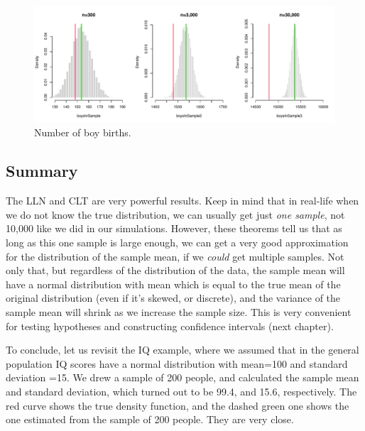 \begin{knitrout}
\begin{figure}
{\centering \includegraphics[width=\maxwidth]{figure/intro-lln5-4-1} 

}

\caption[Number of boy births]{Number of boy births.}\label{fig:intro-lln5-4}
\end{figure}

\begin{kframe}\begin{alltt}
\hlstd{(}\hlstd{=}\hlstd{(}\hlstd{,}\hlstd{))}
\end{alltt}
\end{kframe}
\end{knitrout}

\subsection{Summary}
The LLN and CLT are very powerful results. Keep in mind that in real-life when we do not know the true distribution, we can usually get just \textit{one sample}, not 10,000 like we did in our simulations.
However, these theorems tell us that as long as this one sample is large enough, we can get a very good approximation for the distribution of the sample mean, if we \textit{could} get multiple samples.
Not only that, but regardless of the distribution of the data, the sample mean will have a normal distribution with mean which is equal to the true mean of the original distribution (even if it's skewed, or discrete), and the variance of the sample mean will shrink as we increase the sample size. This is very convenient for testing hypotheses and constructing confidence intervals (next chapter).

To conclude, let us revisit the IQ example, where we assumed that in the general population IQ scores have a normal distribution with mean=100 and  standard deviation =15.
We drew a sample of 200 people, and calculated the sample mean and standard deviation, which turned out to be 99.4, and 15.6, respectively.
The red curve shows the true density function, and the dashed green one shows the one estimated from the sample of 200 people. They are very close.

